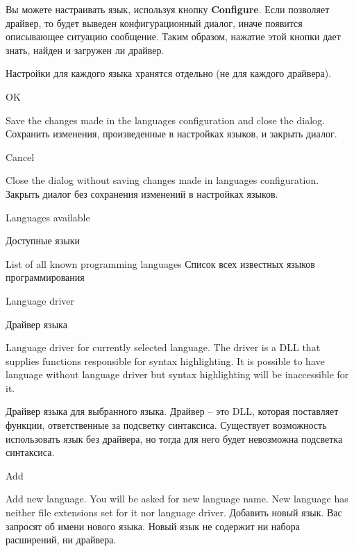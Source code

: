 Вы можете настраивать язык, используя кнопку {\bf Configure}. Если позволяет
драйвер, то будет выведен конфигурационный диалог, иначе появится описывающее
ситуацию сообщение. Таким образом, нажатие этой кнопки дает знать, найден и 
загружен ли драйвер.
 
Настройки для каждого языка хранятся отдельно (не для каждого драйвера).
\fi

\begin{popup}
\caption{OK}

\ifenglish
Save the changes made in the languages configuration and close the dialog.
\else
Сохранить изменения, произведенные в настройках языков, и закрыть диалог.
\fi
\end{popup}

\begin{popup}
\caption{Cancel}

\ifenglish
Close the dialog without saving changes made in languages configuration.
\else
Закрыть диалог без сохранения изменений в настройках языков.
\fi
\end{popup}

\begin{popup}
\ifenglish
\caption{Languages available}
\else
\caption{Доступные языки}
\fi
{}

\ifenglish
List of all known programming languages
\else
Список всех известных языков программирования
\fi
\end{popup}

\begin{popup}
\ifenglish
\caption{Language driver}
\else
\caption{Драйвер языка}
\fi
{}

\ifenglish
Language driver for currently selected language. The driver is a DLL that
supplies functions responsible for syntax highlighting. It is possible to
have language without language driver but syntax highlighting will be
inaccessible for it.

\else
Драйвер языка для выбранного языка. Драйвер -- это DLL, которая поставляет 
функции, ответственные за подсветку синтаксиса. Существует возможность 
использовать язык без драйвера, но тогда для него будет невозможна подсветка
синтаксиса.
\fi
\end{popup}

\begin{popup}
\caption{Add}

\ifenglish
Add new language. You will be asked for new language name. New language has neither
file extensions set for it nor language driver.
\else
Добавить новый язык. Вас запросят об имени нового языка. Новый язык не содержит ни
набора расширений, ни драйвера.
\fi
\end{popup}

